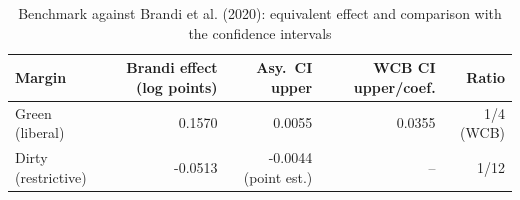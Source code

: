 \begin{table}[htbp]
\centering
\caption{Benchmark against Brandi et al. (2020): equivalent effect and comparison with the confidence intervals}
\label{tab:brandi}
\small
\begin{tabular}{lrrrr}
\toprule
Margin & Brandi effect (log points) & Asy.\ CI upper & WCB CI upper/coef. & Ratio \\
\midrule
Green (liberal) & 0.1570 & 0.0055 & 0.0355 & 1/4 (WCB) \\
Dirty (restrictive) & -0.0513 & -0.0044 (point est.) & -- & 1/12 \\
\bottomrule
\end{tabular}
\end{table}
